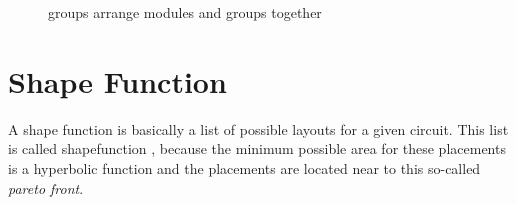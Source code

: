 \begin{figure}
	\centering
	\caption{groups arrange modules and groups together}
	\label{fig:group_of_modules}
\end{figure}

\section{Shape Function}
A shape function is basically a list of possible layouts for a given circuit. This list is called shapefunction , because the minimum possible area for these placements is a hyperbolic function and the placements are located near to this so-called \emph{pareto front}.

